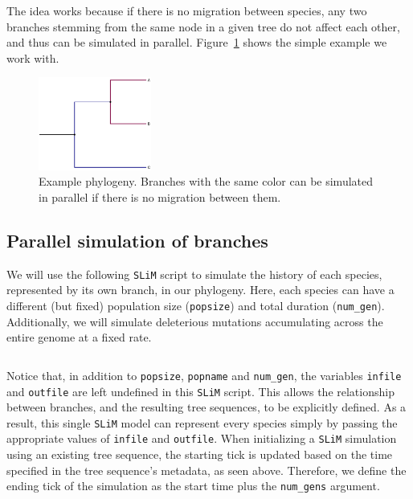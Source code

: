\documentclass[12pt]{article}
\newcommand{\slim}[0]{\texttt{SLiM}\xspace}
\begin{document}
The idea works because if there is no migration between species,
any two branches stemming from the same node in a given tree do not affect each other,
and thus can be simulated in parallel.
Figure~\ref{fig:phylo} shows the simple example we work with.

\begin{figure}[h!]
    \centering
     \includegraphics[width=0.33\textwidth]{code/parallelizing_multiple_species/phylo.pdf}
     \caption{
         Example phylogeny.
         Branches with the same color can be simulated in parallel if there is no migration between them.
     }
     \label{fig:phylo}
\end{figure}

\subsection{Parallel simulation of branches}

We will use the following \slim script to simulate the history of each species, represented by its own branch, in our phylogeny. Here, each species can have a different
(but fixed) population size (\verb|popsize|) and total duration (\verb|num_gen|).
Additionally, we will simulate deleterious mutations accumulating across the entire genome at a fixed rate.
%
\inputminted[breaklines, breakautoindent=true, breakanywhere=true, fontsize=\small, linenos, bgcolor=gray!10]{slim}{code/parallelizing_multiple_species/simulate_branch.slim}
%
Notice that, in addition to \verb|popsize|, \verb|popname| and \verb|num_gen|, the variables \verb|infile| and \verb|outfile| are left undefined in this \slim script.
This allows the relationship between branches, and the
resulting tree sequences, to be explicitly defined. As a result, this single \slim model can represent every species simply by passing the appropriate values of \verb|infile| and \verb|outfile|.
When initializing a \slim simulation using an existing tree sequence, the starting tick is updated
based on the time specified in the tree sequence's metadata, as seen above.
Therefore, we define the ending tick of the simulation as the start time plus the \verb|num_gens| argument.
\end{document}

